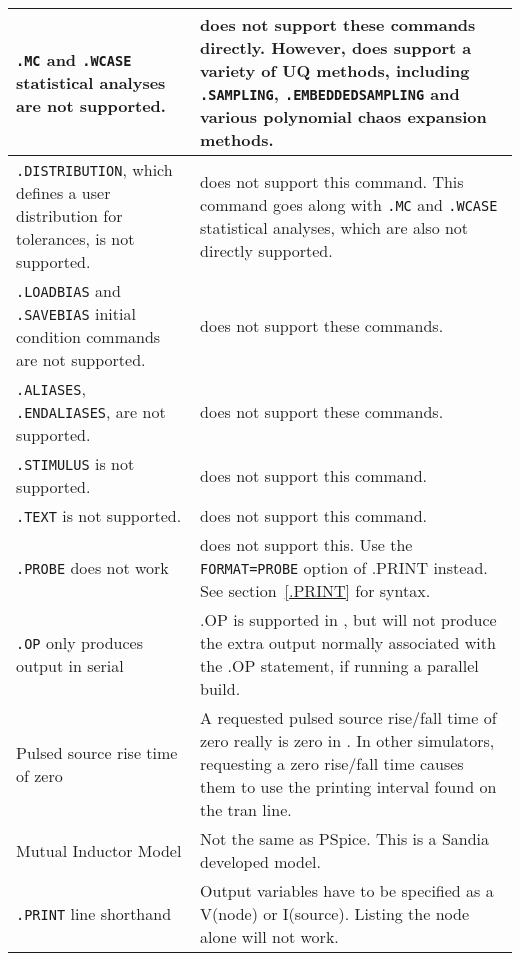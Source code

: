 \begin{longtable}[h] {>{\raggedright\small}m{2in}|>{\raggedright\let\\\tabularnewline\small}m{4in}}
\texttt{.MC} and \texttt{.WCASE} statistical analyses are not supported.  
  & \Xyce{} does not support these commands directly. However, \Xyce{} does support a variety of UQ methods, including \texttt{.SAMPLING}, \texttt{.EMBEDDEDSAMPLING} and various polynomial chaos expansion methods.
\\ \hline

\texttt{.DISTRIBUTION}, which defines a user distribution for tolerances, is not supported.  
& \Xyce{} does not support this command.  This command goes along with 
\texttt{.MC} and \texttt{.WCASE} statistical analyses, which are also not directly supported. \\ \hline

\texttt{.LOADBIAS} and \texttt{.SAVEBIAS} initial condition commands are not supported.  
& \Xyce{} does not support these commands.  \\ \hline

\texttt{.ALIASES}, \texttt{.ENDALIASES}, are not supported.
& \Xyce{} does not support these commands.  \\ \hline

\texttt{.STIMULUS} is not supported.  & \Xyce{} does not support this command.  \\ \hline

\texttt{.TEXT} is not supported.  & \Xyce{} does not support this command.  \\ \hline

\texttt{.PROBE} does not work & \Xyce{} does not support this.  Use the 
\texttt{FORMAT=PROBE} option of .PRINT instead.  See 
section~\ref{.PRINT} for syntax.\\ \hline

\texttt{.OP} only produces output in serial & .OP is supported in \Xyce{}, but will not
produce the extra output normally associated with the .OP statement, if running a parallel build.\\ \hline

Pulsed source rise time of zero & A requested pulsed source rise/fall time of
zero really is zero in \Xyce{}.  In other simulators, requesting a zero
rise/fall time causes them to use the printing interval found on the tran
line.\\ \hline

Mutual Inductor Model & Not the same as PSpice.  This is a Sandia developed
model. \\ \hline

\texttt{.PRINT} line shorthand & Output variables have to be specified as a
V(node) or I(source). Listing the node alone will not work. \\ \hline


\end{longtable}

